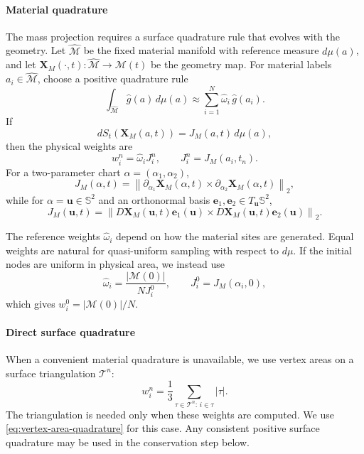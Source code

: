 \documentclass[a4paper,fleqn]{cas-sc}
\begin{document}
\paragraph{Material quadrature}
The mass projection requires a surface quadrature rule that evolves with the
geometry.  Let $\widehat{\mathcal M}$ be the fixed material manifold with
reference measure $d\mu(a)$, and let $
  \bm X_M(\cdot,t):\widehat{\mathcal M}\rightarrow\mathcal M(t)
$
be the geometry map.  For material labels $a_i\in\widehat{\mathcal M}$, choose
a positive quadrature rule
\begin{equation}
  \int_{\widehat{\mathcal M}}\widehat g(a)\,d\mu(a)
  \approx
  \sum_{i=1}^N\widehat\omega_i\,\widehat g(a_i).
  \label{eq:material-quadrature}
\end{equation}
If
\[
  dS_t(\bm X_M(a,t))=J_M(a,t)\,d\mu(a),
\]
then the physical weights are
\begin{equation}
  w_i^n=\widehat\omega_iJ_i^n,
  \qquad
  J_i^n=J_M(a_i,t_n).
  \label{eq:geometry-quadrature-weights}
\end{equation}
For a two-parameter chart $\alpha=(\alpha_1,\alpha_2)$,
\begin{equation}
  J_M(\alpha,t)
  =
  \left\|
    \partial_{\alpha_1}\bm X_M(\alpha,t)
    \times
    \partial_{\alpha_2}\bm X_M(\alpha,t)
  \right\|_2,
  \label{eq:chart-surface-jacobian}
\end{equation}
while for $\alpha=\bm u\in\mathbb S^2$ and an orthonormal basis
$\bm e_1,\bm e_2\in T_{\bm u}\mathbb S^2$,
\begin{equation}
  J_M(\bm u,t)
  =
  \left\|
    D\bm X_M(\bm u,t)\bm e_1(\bm u)
    \times
    D\bm X_M(\bm u,t)\bm e_2(\bm u)
  \right\|_2.
  \label{eq:spherical-surface-jacobian}
\end{equation}

The reference weights $\widehat\omega_i$ depend on how the material sites are
generated.  Equal weights are natural for quasi-uniform sampling with respect
to $d\mu$.  If the initial nodes are uniform in physical area, we instead use
\begin{equation}
  \widehat\omega_i
  =
  \frac{|\mathcal M(0)|}{N J_i^0},
  \qquad
  J_i^0=J_M(\alpha_i,0),
  \label{eq:initial-area-uniform-material-weights}
\end{equation}
which gives $w_i^0=|\mathcal M(0)|/N$.

\paragraph{Direct surface quadrature}
When a convenient material quadrature is unavailable, we use vertex areas on
a surface triangulation $\mathcal T^n$:
\begin{equation}
  w_i^n
  =
  \frac13
  \sum_{\tau\in\mathcal T^n:\,i\in\tau}|\tau|.
  \label{eq:vertex-area-quadrature}
\end{equation}
The triangulation is needed only when these weights are computed.
We use \eqref{eq:vertex-area-quadrature} for this case.  Any consistent
positive surface quadrature may be used in the conservation step below.
\end{document}
